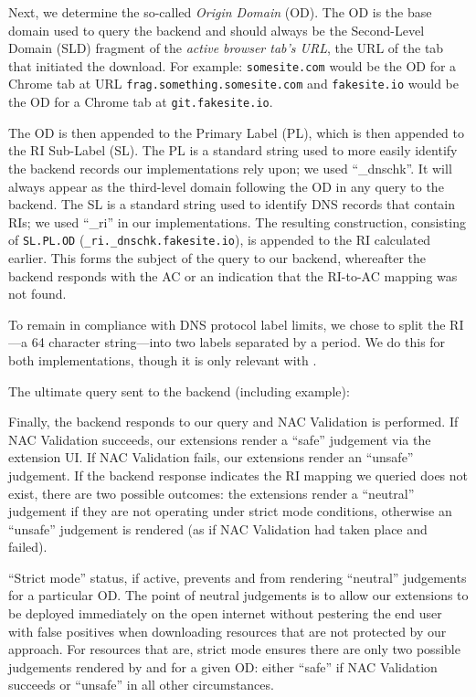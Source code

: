 Next, we determine the so-called \emph{Origin Domain} (OD). The OD is the base
domain used to query the backend and should always be the Second-Level Domain
(SLD) fragment of the \emph{active browser tab's URL}, \ie the URL of the tab
that initiated the download. For example: \texttt{somesite.com} would be the OD
for a Chrome tab at URL \texttt{frag.something.somesite.com} and
\texttt{fakesite.io} would be the OD for a Chrome tab at
\texttt{git.fakesite.io}.

The OD is then appended to the Primary Label (PL), which is then appended to the
RI Sub-Label (SL). The PL is a standard string used to more easily identify the
backend records our implementations rely upon; we used ``\_dnschk''. It will
always appear as the third-level domain following the OD in any query to the
backend. The SL is a standard string used to identify DNS records that contain
RIs; we used ``\_ri'' in our implementations. The resulting construction,
consisting of \texttt{SL.PL.OD} (\eg \texttt{\_ri.\_dnschk.fakesite.io}), is
appended to the RI calculated earlier. This forms the subject of the query to
our backend, whereafter the backend responds with the AC or an indication that
the RI-to-AC mapping was not found.

To remain in compliance with DNS protocol label limits, we chose to split the
RI---a 64 character string---into two labels separated by a period. We do this
for both implementations, though it is only relevant with \DNSSYS{}.

The ultimate query sent to the backend (including example): \\

Finally, the backend responds to our query and NAC Validation is performed. If
NAC Validation succeeds, our extensions render a ``safe'' judgement via the
extension UI. If NAC Validation fails, our extensions render an ``unsafe''
judgement. If the backend response indicates the RI mapping we queried does not
exist, there are two possible outcomes: the extensions render a ``neutral''
judgement if they are not operating under strict mode conditions, otherwise an
``unsafe'' judgement is rendered (as if NAC Validation had taken place and
failed).

``Strict mode'' status, if active, prevents \DNSSYS{} and \DHTSYS{} from
rendering ``neutral'' judgements for a particular OD. The point of neutral
judgements is to allow our extensions to be deployed immediately on the open
internet without pestering the end user with false positives when downloading
resources that are not protected by our approach. For resources that are, strict
mode ensures there are only two possible judgements rendered by \DNSSYS{} and
\DHTSYS{} for a given OD: either ``safe'' if NAC Validation succeeds or
``unsafe'' in all other circumstances.


